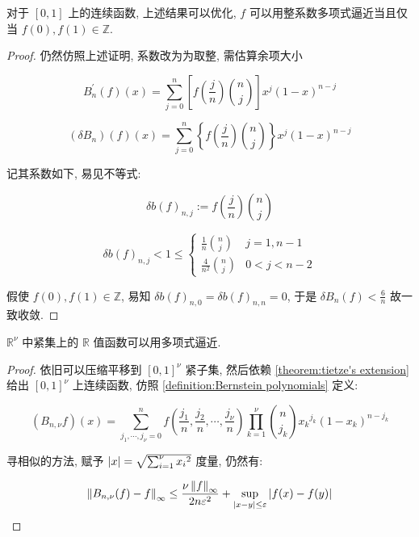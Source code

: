\begin{theorem}[J.Pál]
    对于 \([0,1]\) 上的连续函数, 上述结果可以优化, \(f\) 可以用整系数多项式逼近当且仅当 \(f(0),f(1) \in \mathbb{Z}\).
    \begin{proof}
        仍然仿照上述证明, 系数改为为取整, 需估算余项大小

        \[
            B_n^\prime (f) (x) = \sum_{j = 0}^{n} \left[{f (\frac{j}{n}) \binom{n}{j}}\right] x^j {(1-x)}^{n-j}
        \]

        \[
            (\delta B_n) (f) (x) = \sum_{j = 0}^{n} \left\{{f (\frac{j}{n}) \binom{n}{j}}\right\} x^j {(1-x)}^{n-j}
        \]

        记其系数如下, 易见不等式:

        \[
            \delta b (f)_{n,j} := {f (\frac{j}{n}) \binom{n}{j}}
        \]

        \[
            \delta b(f)_{n,j} < 1 \leq \begin{cases}
                \frac{1}{n} \binom{n}{j} & j=1,n-1 \\
                \frac{4}{n^2} \binom{n}{j} & 0 < j < n-2
            \end{cases}
        \]

        假使 \(f(0),f(1) \in \mathbb{Z}\), 易知 \(\delta b (f)_{n,0} = \delta b (f)_{n,n} = 0\),
        于是 \(\delta B_n (f) < \frac{6}{n}\) 故一致收敛.
    \end{proof}
\end{theorem}

\begin{theorem}
    \label {theorem:Weierstrass's approximation theorem}
    \(\mathbb{R}^{\nu}\) 中紧集上的 \(\mathbb{R}\) 值函数可以用多项式逼近.

    \begin{proof}
        依旧可以压缩平移到 \({[0,1]}^\nu\) 紧子集, 然后依赖 \ref{theorem:tietze's extension} 给出 \({[0,1]}^\nu\) 上连续函数, 仿照 \ref{definition:Bernstein polynomials} 定义:

        \[
            (B_{n,\nu} f) (x) = \sum_{j_1,\cdots,j_\nu = 0}^{n} f(\frac{j_1}{n},\frac{j_2}{n},\cdots,\frac{j_\nu}{n}) \prod_{k=1}^{\nu} \binom{n}{j_k} {x_k}^{j_k} {(1-x_k)}^{n - j_k}
        \]

        寻相似的方法, 赋予 \(\abs{x} = \sqrt{\sum_{i=1}^{\nu} {x_i}^2}\) 度量, 仍然有:

        \[
            \left\| B_{n,\nu} (f) - f \right\|_\infty \leq \frac{\nu \left\|f\right\|_\infty}{2n\varepsilon^2} + \sup_{\abs{x-y} \leq \varepsilon} \abs{f(x) - f(y)}
        \]
    \end{proof}
\end{theorem}


